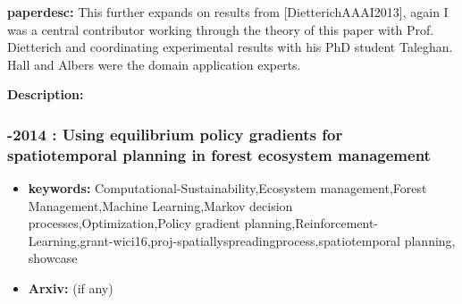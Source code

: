 \documentclass{article}
\begin{document}
\textbf{paperdesc:} This further expands on results from [DietterichAAAI2013], again I was a central contributor working through the theory of this paper with Prof. Dietterich and coordinating experimental results with his PhD student Taleghan. Hall and Albers were the domain application experts.

\textbf{Description:} 



\newpage
\subsubsection{\textbf{-2014} : Using equilibrium policy gradients for spatiotemporal planning in forest ecosystem management}
\begin{itemize}
\item \textbf{keywords:} Computational-Sustainability,Ecosystem management,Forest Management,Machine Learning,Markov decision processes,Optimization,Policy gradient planning,Reinforcement-Learning,grant-wici16,proj-spatiallyspreadingprocess,spatiotemporal planning, showcase
\item \textbf{Arxiv:}  (if any)
\end{itemize}

\end{document}
